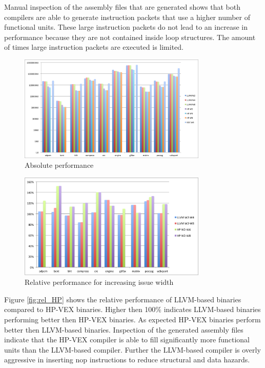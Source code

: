 Manual inspection of the assembly files that are generated shows that both compilers are able to generate instruction packets that use a higher number of functional units. These large instruction packets do not lead to an increase in performance because they are not contained inside loop structures. The amount of times large instruction packets are executed is limited. 


\begin{figure}[ht]
\centering
\includegraphics[width=0.8\textwidth]{5_results/img/abs_perf.png}
\caption{Absolute performance}
\label{fig:abs_perf}
\end{figure}

\begin{figure}[ht]
\centering
\includegraphics[width=0.8\textwidth]{5_results/img/rel_issue.png}
\caption{Relative performance for increasing issue width}
\label{fig:rel_issue}
\end{figure}

Figure \ref{fig:rel_HP} shows the relative performance of LLVM-based binaries compared to HP-VEX binaries. Higher then 100\% indicates LLVM-based binaries performing better then HP-VEX binaries. As expected HP-VEX binaries perform better then LLVM-based binaries. Inspection of the generated assembly files indicate that the HP-VEX compiler is able to fill significantly more functional units than the LLVM-based compiler. Further the LLVM-based compiler is overly aggressive in inserting nop instructions to reduce structural and data hazards.


